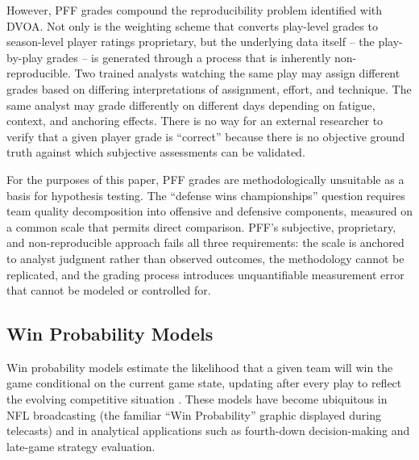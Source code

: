 However, PFF grades compound the reproducibility problem identified with DVOA. Not only is the weighting scheme that converts play-level grades to season-level player ratings proprietary, but the underlying data itself  -- the play-by-play grades  -- is generated through a process that is inherently non-reproducible. Two trained analysts watching the same play may assign different grades based on differing interpretations of assignment, effort, and technique. The same analyst may grade differently on different days depending on fatigue, context, and anchoring effects. There is no way for an external researcher to verify that a given player grade is ``correct'' because there is no objective ground truth against which subjective assessments can be validated.

For the purposes of this paper, PFF grades are methodologically unsuitable as a basis for hypothesis testing. The ``defense wins championships'' question requires team quality decomposition into offensive and defensive components, measured on a common scale that permits direct comparison. PFF's subjective, proprietary, and non-reproducible approach fails all three requirements: the scale is anchored to analyst judgment rather than observed outcomes, the methodology cannot be replicated, and the grading process introduces unquantifiable measurement error that cannot be modeled or controlled for.

\subsection{Win Probability Models}
\label{sec:win-probability}

Win probability models estimate the likelihood that a given team will win the game conditional on the current game state, updating after every play to reflect the evolving competitive situation \parencite{stern1991probability}. These models have become ubiquitous in NFL broadcasting (the familiar ``Win Probability'' graphic displayed during telecasts) and in analytical applications such as fourth-down decision-making and late-game strategy evaluation.

